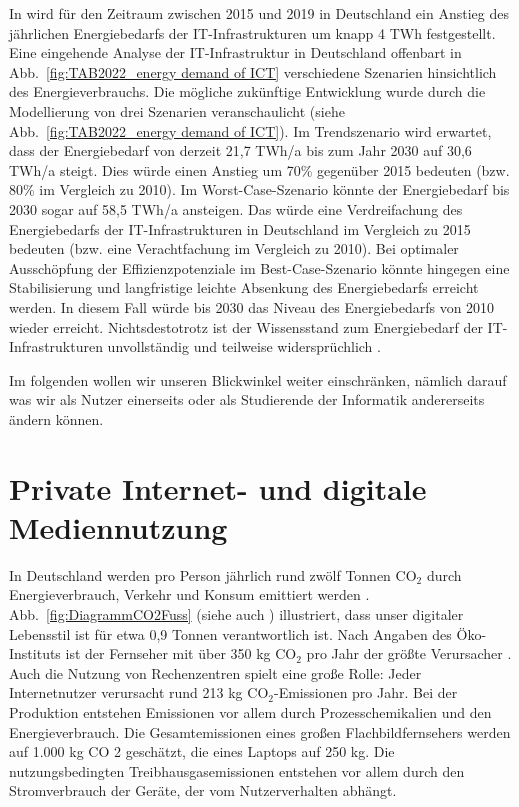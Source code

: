 \documentclass{article}
\begin{document}
In  \cite{grunwald_energieverbrauch_2022} wird  für den Zeitraum zwischen 2015 und 2019 in Deutschland ein Anstieg des jährlichen Energiebedarfs der IT-Infrastrukturen um knapp 4 TWh festgestellt. Eine eingehende Analyse der IT-Infrastruktur in Deutschland offenbart in Abb.~\ref{fig:TAB2022_energy demand of ICT}  verschiedene Szenarien hinsichtlich des Energieverbrauchs. 
  Die mögliche zukünftige Entwicklung wurde durch die Modellierung von drei Szenarien veranschaulicht (siehe Abb.~\ref{fig:TAB2022_energy demand of ICT}). Im Trendszenario wird erwartet, dass der Energiebedarf von derzeit 21,7 TWh/a bis zum Jahr 2030 auf 30,6 TWh/a steigt. Dies würde einen Anstieg um 70\% gegenüber 2015 bedeuten (bzw. 80\% im Vergleich zu 2010). Im Worst-Case-Szenario könnte der Energiebedarf bis 2030 sogar auf 58,5 TWh/a ansteigen. Das würde eine Verdreifachung des Energiebedarfs der IT-Infrastrukturen in Deutschland im Vergleich zu 2015 bedeuten (bzw. eine Verachtfachung im Vergleich zu 2010). Bei optimaler Ausschöpfung der Effizienzpotenziale im Best-Case-Szenario könnte hingegen eine Stabilisierung und langfristige leichte Absenkung des Energiebedarfs erreicht werden. In diesem Fall würde bis 2030 das Niveau des Energiebedarfs von 2010 wieder erreicht.
	Nichtsdestotrotz ist der Wissensstand zum Energiebedarf der IT-Infrastrukturen unvollständig und teilweise widersprüchlich \cite{grunwald_energieverbrauch_2022}.
	
	Im folgenden wollen wir unseren Blickwinkel weiter einschränken, nämlich darauf was wir als Nutzer einerseits oder als Studierende der Informatik  andererseits ändern können.

\section{Private Internet- und digitale Mediennutzung}
In Deutschland werden  pro Person jährlich rund zwölf Tonnen CO$_2$ durch Energieverbrauch, Verkehr und Konsum  emittiert werden \cite{energieeffizienz_IT_2020}. 
Abb.~\ref{fig:DiagrammCO2Fuss} (siehe auch \cite{infografik_DigFuss_2022}) illustriert, dass  unser digitaler Lebensstil ist für etwa 0,9 Tonnen verantwortlich ist. Nach Angaben des Öko-Instituts ist der Fernseher mit über 350 kg CO$_2$ pro Jahr der größte Verursacher \cite{energieeffizienz_IT_2020}. Auch die Nutzung von Rechenzentren spielt eine große Rolle: Jeder Internetnutzer verursacht rund 213 kg CO$_2$-Emissionen pro Jahr.
Bei der Produktion entstehen Emissionen vor allem durch Prozesschemikalien und den Energieverbrauch. Die Gesamtemissionen eines großen Flachbildfernsehers werden auf 1.000 kg CO 2 geschätzt, die eines Laptops auf 250 kg.
Die nutzungsbedingten Treibhausgasemissionen entstehen vor allem durch den Stromverbrauch der Geräte, der vom Nutzerverhalten abhängt\cite{energieeffizienz_IT_2020}. 
\end{document}
